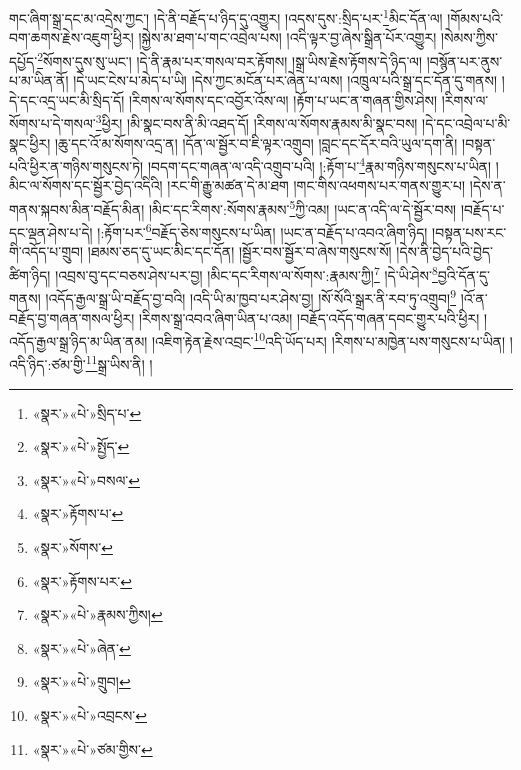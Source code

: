 གང་ཞིག་སྒྲ་དང་མ་འདྲེས་ཀྱང་། །དེ་ནི་བརྗོད་པ་ཉིད་དུ་འགྱུར། །འདས་དུས་:སྲིད་པར་\footnote{«སྣར་»«པེ་»སྲིད་པ་}མིང་དོན་ལ། །གོམས་པའི་བག་ཆགས་རྗེས་འཇུག་ཕྱིར། །སྐྱེས་མ་ཐག་པ་གང་འབྲེལ་པས། །འདི་ལྟར་བྱ་ཞེས་སྒྲིན་པོར་འགྱུར། །སེམས་ཀྱིས་དཔྱོད་\footnote{«སྣར་»«པེ་»སྤྱོད་}སོགས་དུས་སུ་ཡང་། །དེ་ནི་རྣམ་པར་གསལ་བར་རྟོགས། །སྒྲ་ཡིས་རྗེས་རྟོགས་དེ་ཉིད་ལ། །བསྙོན་པར་ནུས་པ་མ་ཡིན་ནོ། །དེ་ཡང་ངེས་པ་མེད་པ་ཡི། །དེས་ཀྱང་མངོན་པར་ཞེན་པ་ལས། །འཁྲུལ་པའི་སྒྲ་དང་དོན་དུ་གནས། །དེ་དང་འདྲ་ཡང་མི་སྲིད་དོ། །རིགས་ལ་སོགས་དང་འབྱོར་འོས་ལ། །རྟོག་པ་ཡང་ན་གཞན་གྱིས་ཤེས། །རིགས་ལ་སོགས་པ་དེ་གསལ་\footnote{«སྣར་»«པེ་»བསལ་}ཕྱིར། །མི་སྣང་བས་ནི་མི་འཐད་དོ། །རིགས་ལ་སོགས་རྣམས་མི་སྣང་བས། །དེ་དང་འབྲེལ་པ་མི་སྣང་ཕྱིར། །ཆུ་དང་འོ་མ་སོགས་འདྲ་ན། །དོན་ལ་སྦྱོར་བ་ཇི་ལྟར་འགྲུབ། །བླང་དང་དོར་བའི་ཡུལ་དག་ནི། །བསྟན་པའི་ཕྱིར་ན་གཉིས་གསུངས་ཏེ། །བདག་དང་གཞན་ལ་འདི་འགྲུབ་པའི། །:རྟོག་པ་\footnote{«སྣར་»རྟོགས་པ་}རྣམ་གཉིས་གསུངས་པ་ཡིན། །མིང་ལ་སོགས་དང་སྦྱོར་བྱེད་འདིའི། །རང་གི་རྒྱུ་མཚན་དེ་མ་ཐག །གང་གིས་འཕགས་པར་གནས་གྱུར་པ། །དེས་ན་གནས་སྐབས་མིན་བརྗོད་མིན། །མིང་དང་རིགས་:སོགས་རྣམས་\footnote{«སྣར་»སོགས་}ཀྱི་འམ། །ཡང་ན་འདི་ལ་དེ་སྦྱོར་བས། །བརྗོད་པ་དང་ལྡན་ཤེས་པ་དེ། །:རྟོག་པར་\footnote{«སྣར་»རྟོགས་པར་}བརྗོད་ཅེས་གསུངས་པ་ཡིན། །ཡང་ན་བརྗོད་པ་འབའ་ཞིག་ཉིད། །བསྟན་པས་རང་གི་འདོད་པ་གྲུབ། །ཐམས་ཅད་དུ་ཡང་མིང་དང་དོན། །སྦྱོར་བས་སྦྱོར་བ་ཞེས་གསུངས་སོ། །དེས་ནི་བྱེད་པའི་བྱེད་ཚིག་ཉིད། །འབྲས་བུ་དང་བཅས་ཤེས་པར་བྱ། །མིང་དང་རིགས་ལ་སོགས་:རྣམས་ཀྱི།\footnote{«སྣར་»«པེ་»རྣམས་ཀྱིས།} །དེ་ཡི་ཤེས་\footnote{«སྣར་»«པེ་»ཞེན་}བྱའི་དོན་དུ་གནས། །འདོད་རྒྱལ་སྒྲ་ཡི་བརྗོད་བྱ་བའི། །འདི་ཡི་མ་ཁྱབ་པར་ཤེས་བྱ། །སོ་སོའི་སྒྲར་ནི་རབ་ཏུ་འགྲུབ།\footnote{«སྣར་»«པེ་»གྲུབ།} །འོ་ན་བརྗོད་བྱ་གཞན་གསལ་ཕྱིར། །རིགས་སྒྲ་འབའ་ཞིག་ཡིན་པ་འམ། །བརྗོད་འདོད་གཞན་དབང་གྱུར་པའི་ཕྱིར། །འདོད་རྒྱལ་སྒྲ་ཉིད་མ་ཡིན་ནམ། །འཇིག་རྟེན་རྗེས་འབྲང་\footnote{«སྣར་»«པེ་»འབྲངས་}འདི་ཡོད་པར། །རིགས་པ་མཁྱེན་པས་གསུངས་པ་ཡིན། །འདི་ཉིད་:ཙམ་གྱི་\footnote{«སྣར་»«པེ་»ཙམ་གྱིས་}སྒྲ་ཡིས་ནི། །

